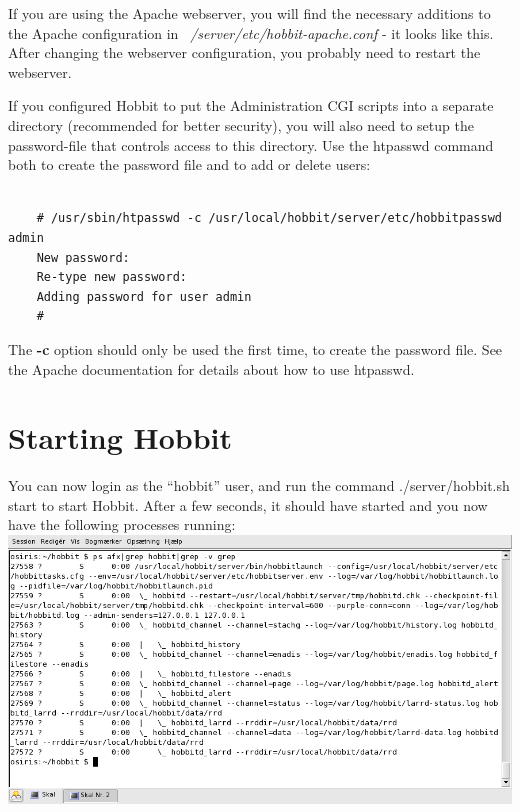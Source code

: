 If you are using the Apache webserver, you will find the necessary additions to the Apache configuration in \emph{~/server/etc/hobbit-apache.conf}
 - it looks like this. After changing the webserver configuration, you probably need to restart the webserver.


 If you configured Hobbit to put the Administration CGI scripts into a separate directory (recommended for better security), you will also need to setup the password-file that controls access to this directory. Use the htpasswd command both to create the password file and to add or delete users:\\ 
\begin{verbatim}

	# /usr/sbin/htpasswd -c /usr/local/hobbit/server/etc/hobbitpasswd admin
	New password:
	Re-type new password:
	Adding password for user admin
	#

\end{verbatim}



 The \textbf{-c}
 option should only be used the first time, to create the password file. See the Apache documentation for details about how to use htpasswd.
\section{Starting Hobbit}


 You can now login as the ``hobbit'' user, and run the command ./server/hobbit.sh start to start Hobbit. After a few seconds, it should have started and you now have the following processes running: \\ 
\includegraphics[scale=1]{./hobbitprocs.png} 


